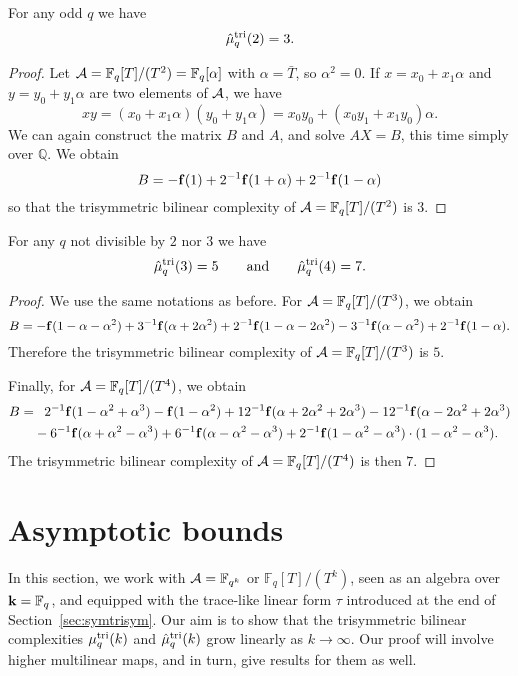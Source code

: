 \documentclass[11pt]{article}
\begin{document}
\begin{prop}For any odd $q$ we have
\[
  \hat\mu^{\textrm{tri}}_q(2) = 3.
\]
\end{prop}
\begin{proof}
Let $\mathcal{A} = \mathbb{F}_{q}[T]/(T^2) = \mathbb{F}_q[\alpha]$ with $\alpha=\bar T$, so $\alpha^2=0$.
If $x = x_0 + x_1\alpha$ and $y = y_0 + y_1\alpha$ are two elements of
$\mathcal{A}$, we have
\[
  xy = (x_0+x_1\alpha)(y_0+y_1\alpha)=x_0y_0+
  (x_0y_1+x_1y_0)\alpha.
\]
We can again construct the matrix $B$ and $A$, and solve $AX=B$, this time
simply over
$\mathbb{Q}$. We obtain
\[
  B = -\mathbf{f}(1) + 2^{-1}\mathbf{f}(1+\alpha)+2^{-1}\mathbf{f}(1-\alpha)
\]
so that the trisymmetric bilinear complexity of
$\mathcal{A}=\mathbb{F}_q[T]/(T^2)$ is $3$.
\end{proof}
\begin{prop}For any $q$ not divisible by $2$ nor $3$ we have
\[
  \hat\mu^{\textrm{tri}}_q(3) = 5\qquad\textrm{and}\qquad\hat\mu^{\textrm{tri}}_q(4) = 7.
\]
\end{prop}
\begin{proof}
We use the same notations as before. For
$\mathcal{A}=\mathbb{F}_{q}[T]/(T^3)$, we obtain
\[
  B =
  -\mathbf{f}(1-\alpha-\alpha^2)+3^{-1}\mathbf{f}(\alpha+2\alpha^2)
  +2^{-1}\mathbf{f}(1-\alpha-2\alpha^2) -
  3^{-1}\mathbf{f}(\alpha-\alpha^2)
  +2^{-1}\mathbf{f}(1-\alpha).
\]
Therefore the trisymmetric bilinear complexity of
$\mathcal{A}=\mathbb{F}_q[T]/(T^3)$ is $5$.

Finally, for $\mathcal{A}=\mathbb{F}_{q}[T]/(T^4)$, we obtain
\begin{equation*}
  \begin{split}
    B =&\phantom{-}2^{-1}\mathbf{f}(1-\alpha^2+\alpha^3)-\mathbf{f}(1-\alpha^2)
  +12^{-1}\mathbf{f}(\alpha+2\alpha^2+2\alpha^3)
  -12^{-1}\mathbf{f}(\alpha-2\alpha^2+2\alpha^3)\\
  &-6^{-1}\mathbf{f}(\alpha+\alpha^2-\alpha^3)
  +6^{-1}\mathbf{f}(\alpha-\alpha^2-\alpha^3)
  +2^{-1}\mathbf{f}(1-\alpha^2-\alpha^3)\cdot(1-\alpha^2-\alpha^3).
  \end{split}
\end{equation*}
The trisymmetric bilinear complexity of $\mathcal{A}=\mathbb{F}_q[T]/(T^4)$ is then $7$.
\end{proof}

\section{Asymptotic bounds}
\label{sec:asymptotic}
In this section, we work with $\mathcal{A}=\mathbb{F}_{q^k}$ or $\mathbb{F}_q[T]/(T^k)$, seen as an algebra over $\mathbf{k}=\mathbb{F}_q$, and equipped with the trace-like linear form $\tau$ introduced at the end of Section~\ref{sec:symtrisym}.
Our aim is to show that the trisymmetric bilinear complexities $\mu^{\textrm{tri}}_q(k)$ and $\hat\mu^{\textrm{tri}}_q(k)$ grow linearly as $k\to\infty$.
Our proof will involve higher multilinear maps, and in turn, give results for them as well.
\end{document}
